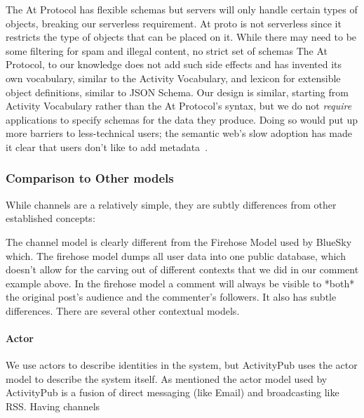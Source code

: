 The At Protocol has flexible schemas but servers will only handle certain types of objects,
breaking our serverless requirement.
At proto is not serverless since it restricts the type of objects that can be placed on it.
While there may need to be some filtering for spam and illegal content, no strict set of schemas
The At Protocol, to our knowledge does not add such side effects and has invented its own vocabulary, similar to the Activity Vocabulary, and lexicon for extensible object definitions, similar to JSON Schema.
Our design is similar, starting from Activity Vocabulary rather than the At Protocol's syntax, but we do not \emph{require} applications to specify schemas for the data they produce. Doing so would put up more barriers to less-technical users; the semantic web's slow adoption has made it clear that users don't like to add metadata~\cite{semanticwebtwodecadeson}.
\subsubsection{Comparison to Other models}

While channels are a relatively simple, they are subtly differences from other established concepts:

The channel model is clearly different from the Firehose Model used by BlueSky
which.
The firehose model dumps all user data into one public database,
which doesn't allow for the carving out of different contexts that we did in our comment
example above. In the firehose model a comment will always be visible to *both* the original post's audience and
the commenter's followers.
It also has subtle differences.
There are several other contextual models.

\paragraph{Actor}

We use actors to describe identities in the system,
but ActivityPub uses the actor model to describe the system itself.
As mentioned the actor model used by ActivityPub is a fusion of
direct messaging (like Email) and broadcasting like RSS.
Having channels

